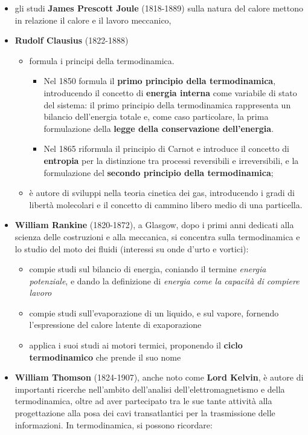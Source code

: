 \begin{itemize}
    \item gli studi \textbf{James Prescott Joule} (1818-1889) sulla natura del calore mettono in relazione il calore e il lavoro meccanico, 
    \item \textbf{Rudolf Clausius} (1822-1888)
        \begin{itemize} 
            \item formula i principi della termodinamica. 
                \begin{itemize}
                    \item Nel 1850 formula il \textbf{primo principio della termodinamica}, introducendo il concetto di \textbf{energia interna} come variabile di stato del sistema: il primo principio della termodinamica rappresenta un bilancio dell'energia totale e, come caso particolare, la prima formulazione della \textbf{legge della conservazione dell'energia}.
                    \item Nel 1865 riformula il principio di Carnot e introduce il concetto di \textbf{entropia} per la distinzione tra processi reversibili e irreversibili, e la formulazione del \textbf{secondo principio della termodinamica};
                \end{itemize} 
            \item è autore di sviluppi nella teoria cinetica dei gas, introducendo i gradi di libertà molecolari e il concetto di cammino libero medio di una particella.
       \end{itemize}
   \item \textbf{William Rankine} (1820-1872), a Glasgow, dopo i primi anni dedicati alla scienza delle costruzioni e alla meccanica, si concentra sulla termodinamica e lo studio del moto dei fluidi (interessi su onde d'urto e vortici):
       \begin{itemize}
           \item compie studi sul bilancio di energia, coniando il termine \textit{energia potenziale}, e dando la definizione di \textit{energia come la capacità di compiere lavoro}
           \item compie studi sull'evaporazione di un liquido, e sul vapore, fornendo l'espressione del calore latente di exaporazione
           \item applica i suoi studi ai motori termici, proponendo il \textbf{ciclo termodinamico} che prende il suo nome
       \end{itemize}
    \item \textbf{William Thomson} (1824-1907), anche noto come \textbf{Lord Kelvin}, è autore di importanti ricerche nell'ambito dell'analisi dell'elettromagnetismo e della termodinamica, oltre ad aver partecipato tra le sue tante attività alla progettazione alla posa dei cavi transatlantici per la trasmissione delle informazioni. In termodinamica, si possono ricordare:

\end{itemize}
